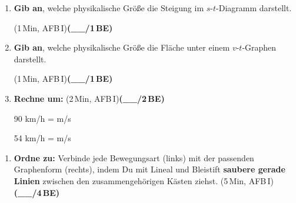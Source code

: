 \documentclass[11pt,a4paper]{article}
\newcommand{\BEZEIT}[3]{%
\hfill{\small\color{zeitgray}(#1\,Min, AFB\,#2)}\quad\textbf{(\_\_/#3\,BE)}%
}
\begin{document}
\vspace{0.5cm}


\noindent{}

\vspace{0.4cm}

\begin{enumerate}
\item[a)] \textbf{Gib an}, welche physikalische Größe die Steigung im $s$-$t$-Diagramm darstellt.

\hfill{\small\color{zeitgray}(1\,Min, AFB\,I)}\quad\textbf{(\_\_/1\,BE)}

\vspace{1.2cm}

\item[b)] \textbf{Gib an}, welche physikalische Größe die Fläche unter einem $v$-$t$-Graphen darstellt.

\hfill{\small\color{zeitgray}(1\,Min, AFB\,I)}\quad\textbf{(\_\_/1\,BE)}

\vspace{1.2cm}

\item[c)] \textbf{Rechne um:} \BEZEIT{2}{I}{2}

\vspace{0.3cm}
\hspace{1cm} 90 km/h = \underline{\hspace{3cm}} m/s

\vspace{0.5cm}
\hspace{1cm} 54 km/h = \underline{\hspace{3cm}} m/s

\end{enumerate}

\newpage

\begin{enumerate}
\item[d)] \textbf{Ordne zu:} Verbinde jede Bewegungsart (links) mit der passenden Graphenform (rechts), indem Du mit Lineal und Bleistift \textbf{saubere gerade Linien} zwischen den zusammengehörigen Kästen ziehst. \BEZEIT{5}{I}{4}
\end{enumerate}
\end{document}
